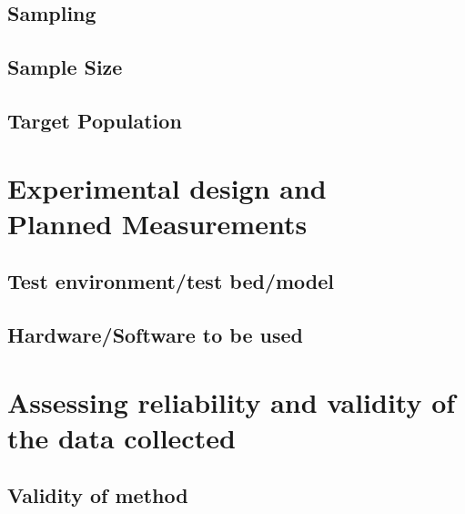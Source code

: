 \subsection{Sampling}

\subsection{Sample Size}

\subsection{Target Population}

\section[Experimental design/Planned Measurements]{Experimental design and\\Planned Measurements}
\label{sec:experimentalDesign}

\subsection{Test environment/test bed/model}

\subsection{Hardware/Software to be used}


\section{Assessing reliability and validity of the data collected}
\label{sec:assessingReliability}



\subsection{Validity of method}
\label{sec:validtyOfMethod}



